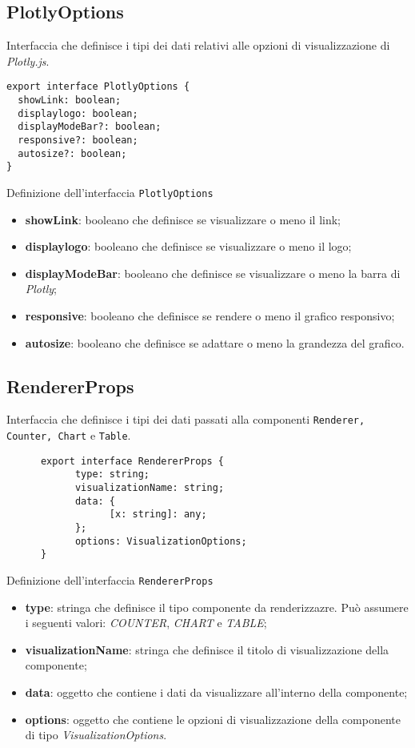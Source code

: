 \subsection{PlotlyOptions}
Interfaccia che definisce i tipi dei dati relativi alle opzioni di visualizzazione di \textit{Plotly.js}.
\begin{verbatim}
export interface PlotlyOptions {
  showLink: boolean;
  displaylogo: boolean;
  displayModeBar?: boolean;
  responsive?: boolean;
  autosize?: boolean;
}
\end{verbatim}
\begin{listing}[H]
      \caption{Definizione dell'interfaccia \texttt{PlotlyOptions}}
      \label{listing:plotlyOptions}
\end{listing}
\begin{itemize}
      \item \textbf{showLink}: booleano che definisce se visualizzare o meno il link;
      \item \textbf{displaylogo}: booleano che definisce se visualizzare o meno il logo;
      \item \textbf{displayModeBar}: booleano che definisce se visualizzare o meno la barra di \textit{Plotly};
      \item \textbf{responsive}: booleano che definisce se rendere o meno il grafico responsivo;
      \item \textbf{autosize}: booleano che definisce se adattare o meno la grandezza del grafico.
\end{itemize}

\subsection{RendererProps}
Interfaccia che definisce i tipi dei dati passati alla componenti \texttt{Renderer, Counter, Chart} e \texttt{Table}.
\begin{listing}[H]
      \begin{verbatim}
      export interface RendererProps {
            type: string;
            visualizationName: string;
            data: {
                  [x: string]: any;
            };
            options: VisualizationOptions;
      }
      \end{verbatim}
      \caption{Definizione dell'interfaccia \texttt{RendererProps}}
      \label{listing:rendererProps}
\end{listing}
\begin{itemize}
      \item \textbf{type}: stringa che definisce il tipo componente da renderizzazre. Può assumere i seguenti valori: \textit{COUNTER}, \textit{CHART} e \textit{TABLE};
      \item \textbf{visualizationName}: stringa che definisce il titolo di visualizzazione della componente;
      \item \textbf{data}: oggetto che contiene i dati da visualizzare all'interno della componente;
      \item \textbf{options}: oggetto che contiene le opzioni di visualizzazione della componente di tipo \textit{VisualizationOptions}.
\end{itemize}

